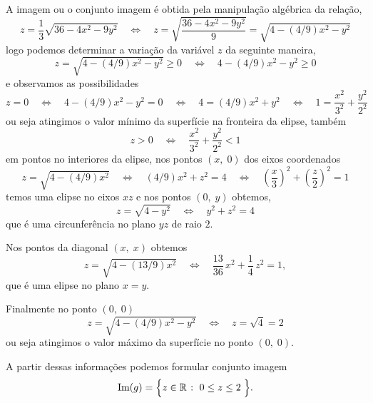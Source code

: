 A imagem ou o conjunto imagem é obtida pela manipulação algébrica da relação,
\begin{equation*}
	z=\dfrac{1}{3}\sqrt{36-4x^{2}-9y^{2}}\quad \Leftrightarrow \quad z=\sqrt{\dfrac{36-4x^{2}-9y^{2}}{9}}=\sqrt{4-(4/9)x^{2}-y^{2}}
\end{equation*}  
logo podemos determinar a variação da variável \(z\) da seguinte maneira,
\begin{equation*}
	z=\sqrt{4-(4/9)x^{2}-y^{2}} \geq 0 \quad \Leftrightarrow \quad 4-(4/9)x^{2}-y^{2} \geq 0
\end{equation*}
e observamos as possibilidades
\begin{equation*}
	z= 0 \quad \Leftrightarrow \quad  4-(4/9)x^{2}-y^{2}=0 \quad \Leftrightarrow\quad 4=(4/9)x^{2}+y^{2}
	\quad \Leftrightarrow \quad 1= \dfrac{x^{2}}{3^{2}}+\dfrac{y^{2}}{2^{2}}
\end{equation*}
ou seja atingimos o valor mínimo da superfície na fronteira da elipse, também
\begin{equation*}
	z > 0 \quad \Leftrightarrow \quad \dfrac{x^{2}}{3^{2}}+\dfrac{y^{2}}{2^{2}} <1
\end{equation*}
em pontos no interiores da elipse, nos pontos \((x,\; 0)\) dos eixos coordenados
\begin{equation*}
	z=\sqrt{4-(4/9)x^{2}}\quad \Leftrightarrow\quad (4/9)x^{2} +z^{2}=4 \quad 
	\Leftrightarrow\quad \left(\dfrac{x}{3}\right)^{2}+\left(\dfrac{z}{2}\right)^{2}=1
\end{equation*} 
temos uma elipse no eixos \(xz\) e nos pontos \((0,\; y)\) obtemos,
\begin{equation*}
	z=\sqrt{4-y^{2}}\quad \Leftrightarrow\quad y^{2}+z^{2}=4
\end{equation*}
que é uma circunferência no plano \(yz\) de raio \(2\).

Nos pontos da diagonal \((x,\; x)\) obtemos
\begin{equation*}
	z = \sqrt{4-(13/9)x^{2}} \quad \Leftrightarrow \quad \frac{13}{36}\,x^{2}+\dfrac{1}{4}\,z^{2}=1,
\end{equation*}
que é uma elipse no plano \(x=y\). 

Finalmente no ponto \((0,\; 0)\)
\begin{equation*}
	z=\sqrt{4-(4/9)x^{2}-y^{2}} \quad \Leftrightarrow\quad z= \sqrt{4} =2 
\end{equation*}
ou seja atingimos o valor máximo da superfície no ponto \((0,\; 0)\). 

A partir dessas informações podemos formular conjunto imagem
\begin{equation*}
	\textrm{Im}(g)=\Bigl\{z\in \mathbb{R} \; \colon \;  0\leq z \leq 2 \; \Bigr\}.
\end{equation*}

